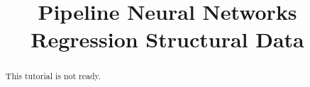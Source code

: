 \documentclass[justified]{tufte-handout}
\title{Pipeline Neural Networks Regression Structural Data}
\begin{document}
\maketitle

\begin{abstract}
\noindent
This tutorial is not ready.
\end{abstract}
\end{document}
